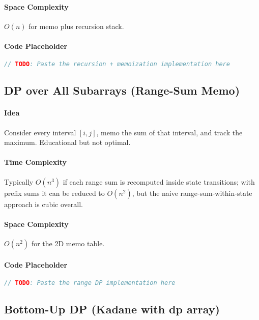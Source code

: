 \documentclass[11pt,a4paper]{article}
\begin{document}
\paragraph{Space Complexity} \(O(n)\) for memo plus recursion stack.

\paragraph{Code Placeholder}
\begin{lstlisting}[language=C++, caption={q2: Top-Down with State}, label={lst:q2-topdown}]
// TODO: Paste the recursion + memoization implementation here
\end{lstlisting}

\subsection{DP over All Subarrays (Range-Sum Memo)}
\paragraph{Idea} Consider every interval \([i, j]\), memo the sum of that interval, and track the maximum. Educational but not optimal.

\paragraph{Time Complexity} Typically \(O(n^3)\) if each range sum is recomputed inside state transitions; with prefix sums it can be reduced to \(O(n^2)\), but the naive range-sum-within-state approach is cubic overall.

\paragraph{Space Complexity} \(O(n^2)\) for the 2D memo table.

\paragraph{Code Placeholder}
\begin{lstlisting}[language=C++, caption={q2: DP over All Subarrays}, label={lst:q2-n2}]
// TODO: Paste the range DP implementation here
\end{lstlisting}

\subsection{Bottom-Up DP (Kadane with dp array)}
\end{document}
